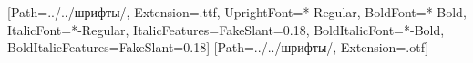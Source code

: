 \def\pfFontPath{../../шрифты/}
\usepackage{fontspec}
\usepackage{unicode-math}
\setmainfont{Manrope}[Path=\pfFontPath, Extension=.ttf,
  UprightFont=*-Regular, BoldFont=*-Bold,
  ItalicFont=*-Regular, ItalicFeatures={FakeSlant=0.18},
  BoldItalicFont=*-Bold, BoldItalicFeatures={FakeSlant=0.18}]
[Path=\pfFontPath, Extension=.otf]
\usepackage{стиль/рисунки}
